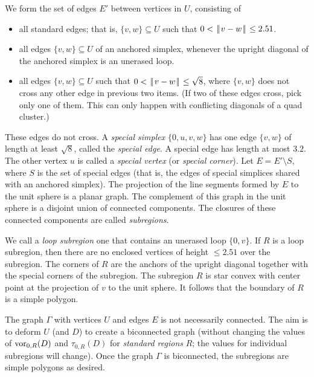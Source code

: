 \documentclass[11pt]{amsart}
\def\op#1{{\text{#1}}}
\def\text{\hbox}
\def\|{{\hskip0.1em|\hskip-0.15em|\hskip0.1em}}
\let\subset=\subseteq
\begin{document}
We form the set of edges $E'$ between vertices in $U$, consisting of
\begin{itemize}
\item all standard edges; that is, $\{v,w\}\subset U$ such that $0<\|v-w\|\le 2.51$.
\item all edges $\{v,w\}\subset U$ of an anchored simplex, whenever the upright diagonal of the anchored simplex is an unerased loop.
\item all edges $\{v,w\}\subset U$ such that $0<\|v-w\|\le\sqrt8$, where $\{v,w\}$ does not cross any other edge in previous two items.  (If two of these edges cross, pick only one of them. This can only happen with conflicting diagonals
of a quad cluster.)
\end{itemize}
These edges do not cross.  A {\it special simplex} $\{0,u,v,w\}$ has one edge $\{v,w\}$ of length at least $\sqrt8$,
called the {\it special edge}.  
A special edge has length at most $3.2$.
The other vertex $u$ is called a {\it special vertex} (or {\it special corner}).
Let $E=E'\setminus S$, where $S$ is the set of special edges (that
is, the edges of special simplices shared with an anchored simplex).
 The projection of the line segments formed by $E$ to the
unit sphere is a planar graph.
The complement of this graph in the unit sphere
is a disjoint union of connected components.  The closures of these connected components are called {\it subregions}.

We call a {\it loop subregion} one that contains an unerased loop $\{0,v\}$.
If $R$ is a loop subregion, then there are no enclosed vertices of height $\le 2.51$ over the
subregion.  The corners of $R$ are the anchors of the upright diagonal together with the special corners
of the subregion.  The subregion $R$ is star convex with center point at the projection of $v$ to the unit sphere.
It follows that the boundary of $R$ is a simple polygon.

The graph $\Gamma$ with vertices $U$ and edges $E$ is not necessarily connected.  The aim is to deform
$U$ (and $D$) to create a biconnected graph (without changing the values of $\op{vor}_{0,R}(D)$ and $\tau_{0,R}(D)$ for {\it standard regions} $R$; the values for individual subregions will change).  Once the graph $\Gamma$
is biconnected, the subregions are simple polygons as desired.
\end{document}

